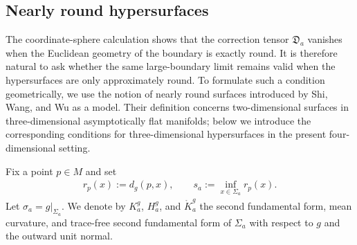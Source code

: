 \documentclass[10pt,a4paper]{amsart}
\begin{document}
	\subsection{Nearly round hypersurfaces}\label{subsec:nearly-round-surface-BY-mass}
	
	
	The coordinate-sphere calculation shows that the correction tensor
	$\mathfrak D_a$ vanishes when the Euclidean geometry of the boundary is
	exactly round. It is therefore natural to ask whether the same
	large-boundary limit remains valid when the hypersurfaces are only
	approximately round. To formulate such a condition geometrically, we
	use the notion of nearly round surfaces introduced by Shi, Wang, and Wu
	\cite{ShiWangWu} as a model. Their definition concerns
	two-dimensional surfaces in three-dimensional asymptotically flat
	manifolds; below we introduce the corresponding conditions for
	three-dimensional hypersurfaces in the present four-dimensional
	setting.
	
	Fix a point $p\in M$ and set
	\begin{align*}
		r_p(x)
		:=
		d_g(p,x),
		\qquad
		s_a
		:=
		\inf_{x\in\Sigma_a}r_p(x).
	\end{align*}
	Let $\sigma_a=g|_{\Sigma_a}$. We denote by $K_a^g$, $H_a^g$, and
	$\mathring K_a^g$ the second fundamental form, mean curvature, and
	trace-free second fundamental form of $\Sigma_a$ with respect to $g$
	and the outward unit normal.
	
\end{document}
